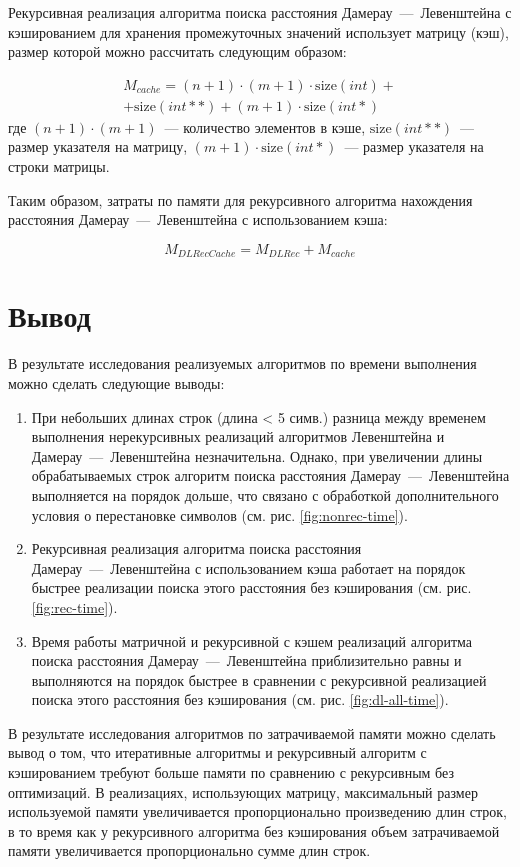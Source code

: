 Рекурсивная реализация алгоритма поиска расстояния Дамерау~---~Левенштейна с кэшированием для хранения промежуточных значений использует матрицу (кэш), размер которой можно рассчитать следующим образом:

\begin{multline}
	M_{cache} = (n + 1) \cdot (m + 1) \cdot \text{size}(int) +\\+ \text{size}(int **) + (m + 1) \cdot \text{size}(int *)
\end{multline}
где $(n + 1) \cdot (m + 1)$~--- количество элементов в кэше,
\newline $\text{size}(int **)$~--- размер указателя на матрицу,
\newline $(m + 1) \cdot \text{size}(int *)$~--- размер указателя на строки матрицы.

Таким образом, затраты по памяти для рекурсивного алгоритма нахождения расстояния Дамерау~---~Левенштейна с использованием кэша:

\begin{equation}
    M_{DLRecCache} = M_{DLRec} + M_{cache}
\end{equation}

\section{Вывод}

В результате исследования реализуемых алгоритмов по времени выполнения можно сделать следующие выводы:

\begin{enumerate}
    \item При небольших длинах строк (длина < 5 симв.) разница между временем выполнения нерекурсивных реализаций алгоритмов Левенштейна и Дамерау~---~Левенштейна незначительна.
    Однако, при увеличении длины обрабатываемых строк алгоритм поиска расстояния Дамерау~---~Левенштейна выполняется на порядок дольше, что связано с обработкой дополнительного условия о перестановке символов (см. рис. \ref{fig:nonrec-time}).
    \item Рекурсивная реализация алгоритма поиска расстояния Дамерау~---~Левенштейна с использованием кэша работает на порядок быстрее реализации поиска этого расстояния без кэширования (см. рис. \ref{fig:rec-time}).
    \item Время работы матричной и рекурсивной с кэшем реализаций алгоритма поиска расстояния Дамерау~---~Левенштейна приблизительно равны и выполняются на порядок быстрее в сравнении с рекурсивной реализацией поиска этого расстояния без кэширования (см. рис. \ref{fig:dl-all-time}).
\end{enumerate}

В результате исследования алгоритмов по затрачиваемой памяти можно сделать вывод о том, что итеративные алгоритмы и рекурсивный алгоритм с кэшированием требуют больше памяти по сравнению с рекурсивным без оптимизаций.
В реализациях, использующих матрицу, максимальный размер используемой памяти увеличивается пропорционально произведению длин строк, в то время как у рекурсивного алгоритма без кэширования объем затрачиваемой памяти увеличивается пропорционально сумме длин строк.